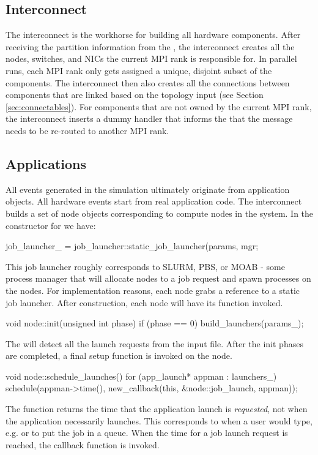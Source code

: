 \begin{enumerate}
\subsection{Interconnect}\label{subsec:interconnect}
The interconnect is the workhorse for building all hardware components.
After receiving the partition information from the ,
the interconnect creates all the nodes, switches, and NICs the current MPI rank is responsible for.
In parallel runs, each MPI rank only gets assigned a unique, disjoint subset of the components.
The interconnect then also creates all the connections between components that are linked based on the topology input (see Section \ref{sec:connectables}).
For components that are not owned by the current MPI rank, the interconnect inserts a dummy handler that informs the 
that the message needs to be re-routed to another MPI rank.

\subsection{Applications}\label{subsec:apps}
All events generated in the simulation ultimately originate from application objects.
All hardware events start from real application code.
The interconnect builds a set of node objects corresponding to compute nodes in the system.
In the constructor for  we have:

\begin{CppCode}
job_launcher_ = job_launcher::static_job_launcher(params, mgr;
\end{CppCode}

This job launcher roughly corresponds to SLURM, PBS, or MOAB - some process manager that will allocate nodes to a job request and spawn processes on the nodes. For implementation reasons, each node grabs a reference to a static job launcher.  After construction, each node will have its  function invoked.

\begin{CppCode}
void
node::init(unsigned int phase)
{
  if (phase == 0){
    build_launchers(params_);
  }
}
\end{CppCode}
The  will detect all the launch requests from the input file.  After the init phases are completed, a final setup function is invoked on the node.

\begin{CppCode}
void
node::schedule_launches()
{
  for (app_launch* appman : launchers_){
    schedule(appman->time(), new_callback(this, &node::job_launch, appman));
  }
}
\end{CppCode}
The function  returns the time that the application launch is \emph{requested}, not when the application  necessarily launches.
This corresponds to when a user would type, e.g.  or  to put the job in a queue.
When the time for a job launch request is reached, the callback function is invoked.


\end{enumerate}
